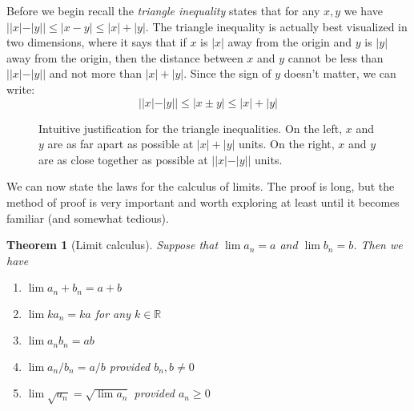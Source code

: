 \documentclass[11pt,oneside]{amsbook}
\newcommand{\R}{\mathbb R}
\theoremstyle{definition}
\theoremstyle{plain}
\newtheorem{theorem}{Theorem}[section]
\theoremstyle{definition}
\theoremstyle{remark}
\numberwithin{equation}{section}
\numberwithin{figure}{section}
\begin{document}
Before we begin recall the \emph{triangle inequality} states that for any $x,y$ we have $||x|-|y||\leq|x-y|\leq|x|+|y|$. The triangle inequality is actually best visualized in two dimensions, where it says that if $x$ is $|x|$ away from the origin and $y$ is $|y|$ away from the origin, then the distance between $x$ and $y$ cannot be less than $||x|-|y||$ and not more than $|x|+|y|$. Since the sign of $y$ doesn't matter, we can write:
\[||x|-|y||\leq|x\pm y|\leq|x|+|y|
\]

\begin{figure}[h]
  \centering
  \quad
  \caption{Intuitive justification for the triangle inequalities. On the left, $x$ and $y$ are as far apart as possible at $|x|+|y|$ units. On the right, $x$ and $y$ are as close together as possible at $||x|-|y||$ units.}
\end{figure}

We can now state the laws for the calculus of limits. The proof is long, but the method of proof is very important and worth exploring at least until it becomes familiar (and somewhat tedious).

\begin{theorem}[Limit calculus]
  Suppose that $\lim a_n=a$ and $\lim b_n=b$. Then we have
  \begin{enumerate}
    \item $\lim a_n+b_n=a+b$
    \item $\lim ka_n=ka$ for any $k\in\R$
    \item $\lim a_nb_n=ab$
    \item $\lim a_n/b_n=a/b$ provided $b_n,b\neq 0$
    \item $\lim \sqrt{a_n}=\sqrt{\lim a_n}$ provided $a_n\geq0$
  \end{enumerate}
\end{theorem}
\end{document}
